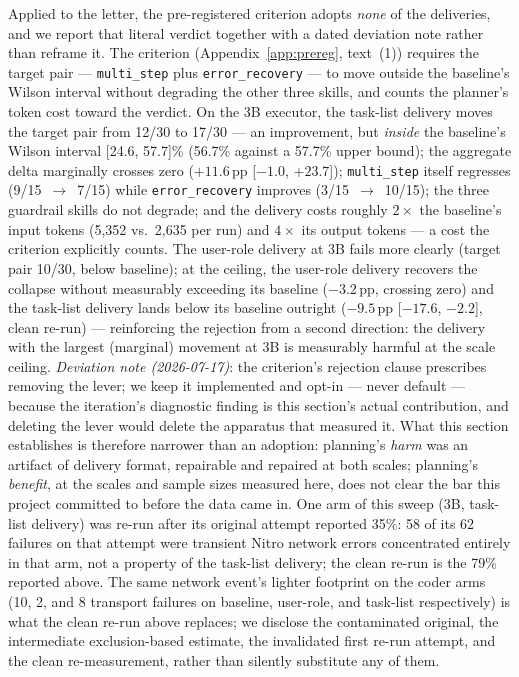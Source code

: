 \documentclass[smallcondensed,natbib]{svjour3}
\begin{document}
Applied to the letter, the pre-registered criterion adopts
\emph{none} of the deliveries, and we report that literal verdict
together with a dated deviation note rather than reframe it. The
criterion (Appendix~\ref{app:prereg}, text~(1)) requires the target
pair --- \texttt{multi\_step} plus \texttt{error\_recovery} --- to
move outside
the baseline's Wilson interval without degrading the other three
skills, and counts the planner's token cost toward the verdict. On the
3B executor, the task-list delivery moves the target pair from 12/30
to 17/30 --- an improvement, but \emph{inside} the baseline's Wilson
interval [24.6, 57.7]\% (56.7\% against a 57.7\% upper bound); the
aggregate delta marginally crosses zero ($+11.6$\,pp [$-1.0$,
$+23.7$]); \texttt{multi\_step} itself regresses (9/15~$\to$~7/15)
while \texttt{error\_recovery} improves (3/15~$\to$~10/15); the three
guardrail skills do not degrade; and the delivery costs roughly
$2\times$ the baseline's input tokens (5{,}352 vs.\ 2{,}635 per run)
and $4\times$ its output tokens --- a cost the criterion explicitly
counts. The user-role delivery at 3B fails more clearly (target pair
10/30, below baseline); at the ceiling, the user-role delivery
recovers the collapse without measurably exceeding its baseline
($-3.2$\,pp, crossing zero) and the task-list delivery lands below
its baseline outright ($-9.5$\,pp [$-17.6$, $-2.2$], clean re-run) ---
reinforcing the rejection from a second direction: the delivery with
the largest (marginal) movement at 3B is measurably harmful at the
scale ceiling. \emph{Deviation note
(2026-07-17)}: the criterion's rejection clause prescribes removing
the lever; we keep it implemented and opt-in --- never default ---
because the iteration's diagnostic finding is this section's actual
contribution, and deleting the lever would delete the apparatus that
measured it. What this section establishes is therefore narrower than
an adoption: planning's \emph{harm} was an artifact of delivery
format, repairable and repaired at both scales; planning's
\emph{benefit}, at the scales and sample sizes measured here, does not
clear the bar this project committed to before the data came in. One
arm of this sweep (3B, task-list delivery) was re-run after its
original attempt reported 35\%: 58 of its 62 failures on that attempt
were transient Nitro network errors concentrated entirely in that arm,
not a property of the task-list delivery; the clean re-run is the 79\%
reported above. The same network event's lighter footprint on the
coder arms (10, 2, and 8 transport failures on baseline, user-role,
and task-list respectively) is what the clean re-run above replaces;
we disclose the contaminated original, the intermediate
exclusion-based estimate, the invalidated first re-run attempt, and
the clean re-measurement, rather than silently substitute any of
them.
\end{document}
